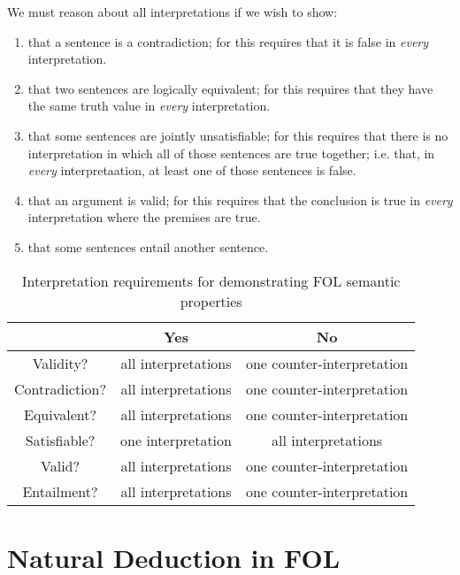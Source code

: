 \documentclass[12pt, a4paper, twoside, openright, titlepage]{book}
\begin{document}
\begin{rmk}{}{}
    We must reason about all interpretations if we wish to show: \begin{enumerate}
        \item that a sentence is a contradiction; for this requires that it is false in \emph{every} interpretation.
        \item that two sentences are logically equivalent; for this requires that they have the same truth value in \emph{every} interpretation. 
        \item that some sentences are jointly unsatisfiable; for this requires that there is no interpretation in which all of those sentences are true together; i.e. that, in \emph{every} interpretaation, at least one of those sentences is false.
        \item that an argument is valid; for this requires that the conclusion is true in \emph{every} interpretation where the premises are true.
        \item that some sentences entail another sentence.
    \end{enumerate}
\end{rmk}


\begin{table}[H]
    \centering
    \caption{Interpretation requirements for demonstrating FOL semantic properties}
    \begin{tabular}{c|cc}
        & \textbf{Yes} & \textbf{No} \\ \hline
        Validity? & all interpretations & one counter-interpretation \\
        Contradiction? & all interpretations & one counter-interpretation \\
        Equivalent? & all interpretations & one counter-interpretation \\
        Satisfiable? & one interpretation & all interpretations \\
        Valid? & all interpretations & one counter-interpretation \\
        Entailment? & all interpretations & one counter-interpretation \\
    \end{tabular}
\end{table}



\chapter{\textsection\textsection Natural Deduction in FOL}
\end{document}
